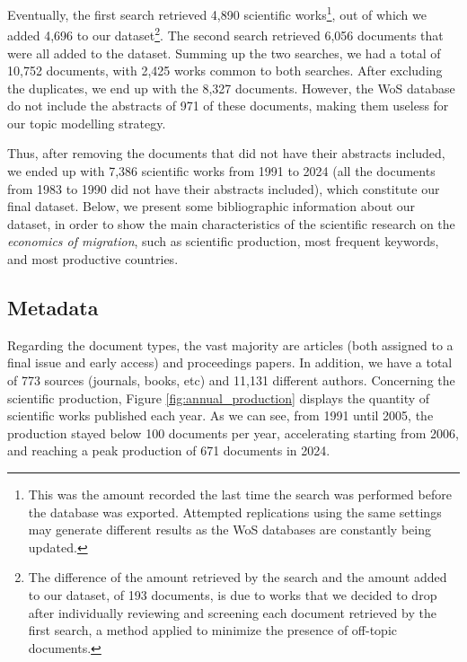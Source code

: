 Eventually, the first search retrieved 4,890 scientific works\footnote{This was the amount recorded the last time the search was performed before the database was exported. Attempted replications using the same settings may generate different results as the WoS databases are constantly being updated.}, out of which we added 4,696 to our dataset\footnote{The difference of the amount retrieved by the search and the amount added to our dataset, of 193 documents, is due to works that we decided to drop after individually reviewing and screening each document retrieved by the first search, a method applied to minimize the presence of off-topic documents.}. The second search retrieved 6,056 documents that were all added to the dataset. Summing up the two searches, we had a total of 10,752 documents, with 2,425 works common to both searches. After excluding the duplicates, we end up with the 8,327 documents. However, the WoS database do not include the abstracts of 971 of these documents, making them useless for our topic modelling strategy.

Thus, after removing the documents that did not have their abstracts included, we ended up with 7,386 scientific works from 1991 to 2024 (all the documents from 1983 to 1990 did not have their abstracts included), which constitute our final dataset. Below, we present some bibliographic information about our dataset, in order to show the main characteristics of the scientific research on the \textit{economics of migration}, such as scientific production, most frequent keywords, and most productive countries.

\subsection{Metadata} \label{metadata}


Regarding the document types, the vast majority are articles (both assigned to a final issue and early access) and proceedings papers. In addition, we have a total of 773 sources (journals, books, etc) and 11,131 different authors. Concerning the scientific production, Figure \ref{fig:annual_production} displays the quantity of scientific works published each year. As we can see, from 1991 until 2005, the production stayed below 100 documents per year, accelerating starting from 2006, and reaching a peak production of 671 documents in 2024.


